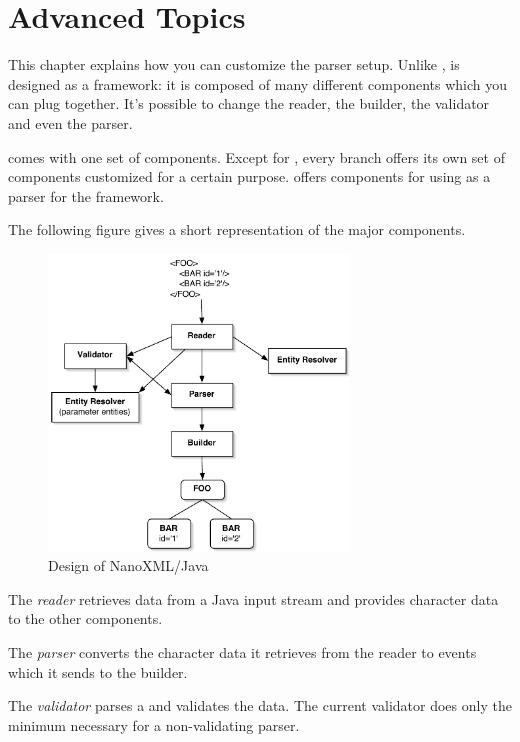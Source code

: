\chapter{Advanced Topics}

This chapter explains how you can customize the \NanoXML{} parser setup.
Unlike ,  is designed as a framework: it is composed of many different components which you can plug together.
It's possible to change the reader, the builder, the validator and even the parser.

 comes with one set of components.
Except for , every branch offers its own set of components customized for a certain purpose.
 offers components for using \NanoXML{} as a parser for the  framework.

The following figure gives a short representation of the major components.

\begin{figure}[ht]
\begin{center}
\includegraphics[width=8cm]{structure.pdf}
\end{center}
\caption{Design of NanoXML/Java}
\end{figure}

The \emph{reader} retrieves data from a Java input stream and provides character data to the other components.

The \emph{parser} converts the character data it retrieves from the reader to \XML{} events which it sends to the builder.

The \emph{validator} parses a  and validates the \XML{} data.
The current validator does only the minimum necessary for a non-validating parser.

